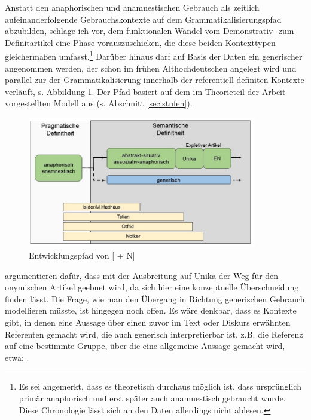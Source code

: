 Anstatt den anaphorischen und anamnestischen Gebrauch als zeitlich aufeinanderfolgende Gebrauchskontexte  auf dem Grammatikalisierungspfad abzubilden, schlage ich vor, dem funktionalen Wandel vom Demonstrativ- zum Definitartikel eine Phase vorauszuschicken, die diese beiden Kontexttypen gleichermaßen umfasst.\footnote{Es sei angemerkt, dass es theoretisch durchaus möglich ist, dass  ursprünglich primär anaphorisch und erst später auch anamnestisch gebraucht wurde. Diese Chronologie lässt sich an den Daten allerdings nicht ablesen.} Darüber hinaus darf auf Basis der Daten ein generischer  angenommen werden, der schon im frühen Althochdeutschen angelegt wird und parallel zur  der Grammatikalisierung innerhalb der referentiell-definiten Kontexte verläuft, s. Abbildung \ref{abb:expansion-definitheit}. Der Pfad basiert auf dem im Theorieteil der Arbeit vorgestellten Modell aus \textcite{Schmuck2014} (s. Abschnitt \ref{sec:stufen}). 

 
\begin{figure}
\begin{center}
  \includegraphics[width=10cm]{images/diskussion-generisch-farbe-neu.jpg}
\caption {Entwicklungspfad von [ + N]} 
\label{abb:expansion-definitheit}
\end{center}
\end{figure} 
 
\textcite[105]{Schmuck2014} argumentieren dafür, dass mit der Ausbreitung auf Unika der Weg für den onymischen Artikel geebnet wird, da sich hier eine konzeptuelle Überschneidung finden lässt. Die Frage, wie man den Übergang in Richtung generischen Gebrauch modellieren müsste, ist hingegen noch offen. Es wäre denkbar, dass es Kontexte gibt, in denen eine Aussage über einen zuvor im Text oder Diskurs erwähnten Referenten gemacht wird, die auch generisch interpretierbar ist, z.B. die Referenz auf eine bestimmte Gruppe, über die eine allgemeine Aussage gemacht wird, etwa: . 

